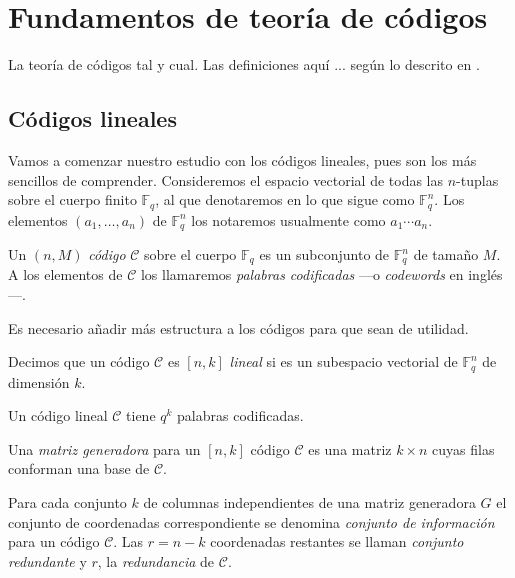 \chapter{Fundamentos de teoría de códigos}

La teoría de códigos tal y cual. Las definiciones aquí ... según lo descrito en \parencite[1-48]{huffman-pless-2003}.

\section{Códigos lineales}

Vamos a comenzar nuestro estudio con los códigos lineales, pues son los más sencillos de comprender. Consideremos el espacio vectorial de todas las \(n\)-tuplas sobre el cuerpo finito \(\mathbb F_q\), al que denotaremos en lo que sigue como \(\mathbb F_q^n\). Los elementos \((a_1, \dots, a_n)\) de \(\mathbb F_q^n\) los notaremos usualmente como \(a_1\!\cdots a_n\).

\begin{definition}
  Un \((n, M)\) \textit{código} \(\mathcal C\) sobre el cuerpo \(\mathbb F_q\) es un subconjunto de \(\mathbb F_q^n\) de tamaño \(M\). A los elementos de \(\mathcal C\) los llamaremos \textit{palabras codificadas} —o \textit{codewords} en inglés—.
\end{definition}

Es necesario añadir más estructura a los códigos para que sean de utilidad.

\begin{definition}
  Decimos que un código \(\mathcal C\) es \([n, k]\) \textit{lineal} si es un subespacio vectorial de \(\mathbb F_q^n\) de dimensión \(k\).
\end{definition}

Un código lineal \(\mathcal C\) tiene \(q^k\) palabras codificadas.

\begin{definition}
  Una \textit{matriz generadora} para un \([n, k]\) código \(\mathcal C\) es una matriz \(k \times n\) cuyas filas conforman una base de \(\mathcal C\).
\end{definition}

Para cada conjunto \(k\) de columnas independientes de una matriz generadora \(G\) el conjunto de coordenadas correspondiente se denomina \textit{conjunto de información} para un código \(\mathcal C\). Las \(r = n - k\) coordenadas restantes se llaman \textit{conjunto redundante} y \(r\), la \textit{redundancia} de \(\mathcal C\).

